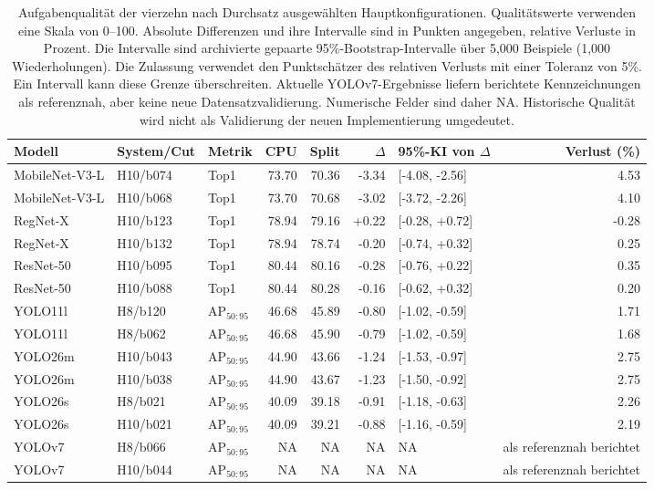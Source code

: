 \begin{table}[t]
\centering\small
\setlength{\tabcolsep}{3pt}
\caption{Aufgabenqualität der vierzehn nach Durchsatz ausgewählten Hauptkonfigurationen. Qualitätswerte verwenden eine Skala von 0--100. Absolute Differenzen und ihre Intervalle sind in Punkten angegeben, relative Verluste in Prozent. Die Intervalle sind archivierte gepaarte 95\%-Bootstrap-Intervalle über 5,000 Beispiele (1,000 Wiederholungen). Die Zulassung verwendet den Punktschätzer des relativen Verlusts mit einer Toleranz von 5\%. Ein Intervall kann diese Grenze überschreiten. Aktuelle YOLOv7-Ergebnisse liefern berichtete Kennzeichnungen als referenznah, aber keine neue Datensatzvalidierung. Numerische Felder sind daher NA. Historische Qualität wird nicht als Validierung der neuen Implementierung umgedeutet.}
\label{tab:quality_highlights}
\begin{tabular}{lllrrrlr}
\toprule
Modell & System/Cut & Metrik & CPU & Split & $\Delta$ & 95\%-KI von $\Delta$ & Verlust (\%)\\
\midrule
MobileNet-V3-L & H10/b074 & Top1 & 73.70 & 70.36 & -3.34 & [-4.08, -2.56] & 4.53\\
MobileNet-V3-L & H10/b068 & Top1 & 73.70 & 70.68 & -3.02 & [-3.72, -2.26] & 4.10\\
RegNet-X & H10/b123 & Top1 & 78.94 & 79.16 & +0.22 & [-0.28, +0.72] & -0.28\\
RegNet-X & H10/b132 & Top1 & 78.94 & 78.74 & -0.20 & [-0.74, +0.32] & 0.25\\
ResNet-50 & H10/b095 & Top1 & 80.44 & 80.16 & -0.28 & [-0.76, +0.22] & 0.35\\
ResNet-50 & H10/b088 & Top1 & 80.44 & 80.28 & -0.16 & [-0.62, +0.32] & 0.20\\
YOLO11l & H8/b120 & AP$_{50:95}$ & 46.68 & 45.89 & -0.80 & [-1.02, -0.59] & 1.71\\
YOLO11l & H8/b062 & AP$_{50:95}$ & 46.68 & 45.90 & -0.79 & [-1.02, -0.59] & 1.68\\
YOLO26m & H10/b043 & AP$_{50:95}$ & 44.90 & 43.66 & -1.24 & [-1.53, -0.97] & 2.75\\
YOLO26m & H10/b038 & AP$_{50:95}$ & 44.90 & 43.67 & -1.23 & [-1.50, -0.92] & 2.75\\
YOLO26s & H8/b021 & AP$_{50:95}$ & 40.09 & 39.18 & -0.91 & [-1.18, -0.63] & 2.26\\
YOLO26s & H10/b021 & AP$_{50:95}$ & 40.09 & 39.21 & -0.88 & [-1.16, -0.59] & 2.19\\
YOLOv7 & H8/b066 & AP$_{50:95}$ & NA & NA & NA & NA & als referenznah berichtet\\
YOLOv7 & H10/b044 & AP$_{50:95}$ & NA & NA & NA & NA & als referenznah berichtet\\
\bottomrule
\end{tabular}
\end{table}
